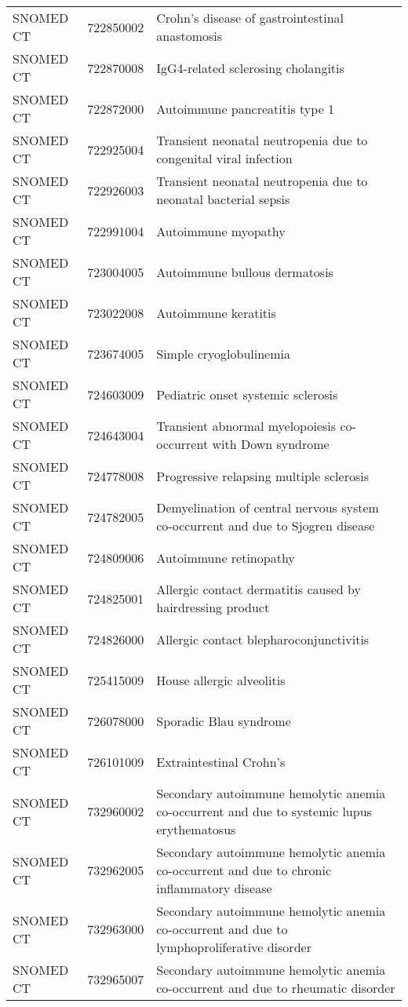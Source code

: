 \begin{longtable}{p{}p{}p{}}
  SNOMED CT & 722850002 & Crohn's disease of gastrointestinal anastomosis \\ 
  SNOMED CT & 722870008 & IgG4-related sclerosing cholangitis \\ 
  SNOMED CT & 722872000 & Autoimmune pancreatitis type 1 \\ 
  SNOMED CT & 722925004 & Transient neonatal neutropenia due to congenital viral infection \\ 
  SNOMED CT & 722926003 & Transient neonatal neutropenia due to neonatal bacterial sepsis \\ 
  SNOMED CT & 722991004 & Autoimmune myopathy \\ 
  SNOMED CT & 723004005 & Autoimmune bullous dermatosis \\ 
  SNOMED CT & 723022008 & Autoimmune keratitis \\ 
  SNOMED CT & 723674005 & Simple cryoglobulinemia \\ 
  SNOMED CT & 724603009 & Pediatric onset systemic sclerosis \\ 
  SNOMED CT & 724643004 & Transient abnormal myelopoiesis co-occurrent with Down syndrome \\ 
  SNOMED CT & 724778008 & Progressive relapsing multiple sclerosis \\ 
  SNOMED CT & 724782005 & Demyelination of central nervous system co-occurrent and due to Sjogren disease \\ 
  SNOMED CT & 724809006 & Autoimmune retinopathy \\ 
  SNOMED CT & 724825001 & Allergic contact dermatitis caused by hairdressing product \\ 
  SNOMED CT & 724826000 & Allergic contact blepharoconjunctivitis \\ 
  SNOMED CT & 725415009 & House allergic alveolitis \\ 
  SNOMED CT & 726078000 & Sporadic Blau syndrome \\ 
  SNOMED CT & 726101009 & Extraintestinal Crohn's \\ 
  SNOMED CT & 732960002 & Secondary autoimmune hemolytic anemia co-occurrent and due to systemic lupus erythematosus \\ 
  SNOMED CT & 732962005 & Secondary autoimmune hemolytic anemia co-occurrent and due to chronic inflammatory disease \\ 
  SNOMED CT & 732963000 & Secondary autoimmune hemolytic anemia co-occurrent and due to lymphoproliferative disorder \\ 
  SNOMED CT & 732965007 & Secondary autoimmune hemolytic anemia co-occurrent and due to rheumatic disorder \\ 

\end{longtable}
